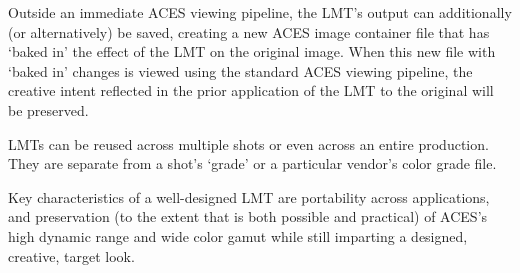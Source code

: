 Outside an immediate ACES viewing pipeline, the LMT’s output can additionally (or alternatively) be saved, creating a new ACES image container file that has `baked in' the effect of the LMT on the original image. When this new file with `baked in' changes is viewed using the standard ACES viewing pipeline, the creative intent reflected in the prior application of the LMT to the original will be preserved. 

LMTs can be reused across multiple shots or even across an entire production. They are separate from a shot's `grade' or a particular vendor's color grade file.

Key characteristics of a well-designed LMT are portability across applications, and preservation (to the extent that is both possible and practical) of ACES's high dynamic range and wide color gamut while still imparting a designed, creative, target look.
